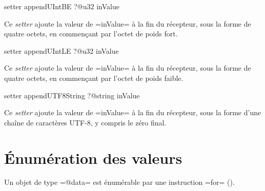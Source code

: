 
\begin{galgas4}
setter appendUIntBE ?@u32 inValue
\end{galgas4}

Ce \emph{setter} ajoute la valeur de \ggsq=inValue= à la fin du récepteur, sous la forme de quatre octets, en commençant par l'octet de poids fort.










\begin{galgas4}
setter appendUIntLE ?@u32 inValue
\end{galgas4}

Ce \emph{setter} ajoute la valeur de \ggsq=inValue= à la fin du récepteur, sous la forme de quatre octets, en commençant par l'octet de poids faible.












\begin{galgas4}
setter appendUTF8String ?@string inValue
\end{galgas4}

Ce \emph{setter} ajoute la valeur de \ggsq=inValue= à la fin du récepteur, sous la forme d'une chaîne de caractères UTF-8, y compris le zéro final.


\section{Énumération des valeurs}

Un objet de type \ggsq=@data= est énumérable par une instruction \ggsq=for= ().
